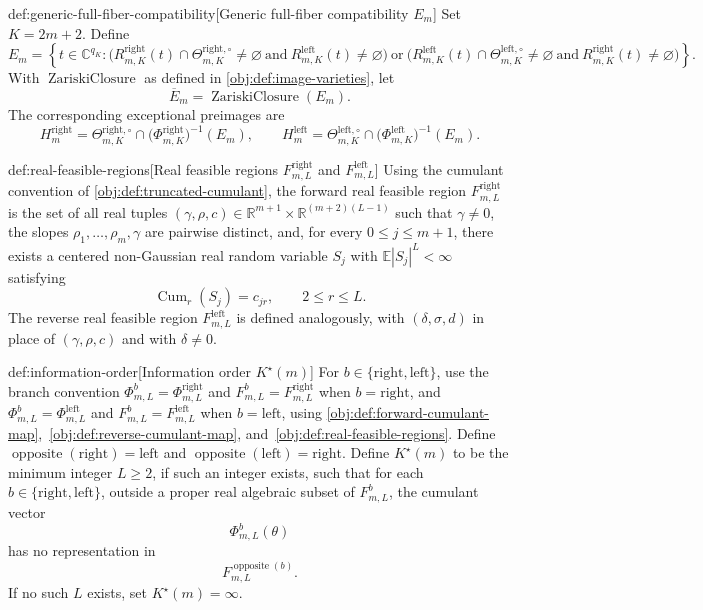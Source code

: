 \begin{definitionv}{def:generic-full-fiber-compatibility}[Generic full-fiber compatibility \(E_m\)]
Set \(K=2m+2\). Define
\[
E_m
=
\left\{
t\in \mathbb C^{q_K}:
\bigl(R^{\mathrm{right}}_{m,K}(t)\cap \Theta^{\mathrm{right},\circ}_{m,K}\neq\varnothing
\ \text{and}\ 
R^{\mathrm{left}}_{m,K}(t)\neq\varnothing\bigr)
\ \text{or}\
\bigl(R^{\mathrm{left}}_{m,K}(t)\cap \Theta^{\mathrm{left},\circ}_{m,K}\neq\varnothing
\ \text{and}\ 
R^{\mathrm{right}}_{m,K}(t)\neq\varnothing\bigr)
\right\}.
\]
With \(\operatorname{ZariskiClosure}\) as defined in \cref{obj:def:image-varieties}, let
\[
\overline E_m=\operatorname{ZariskiClosure}(E_m).
\]
The corresponding exceptional preimages are
\[
H^{\mathrm{right}}_m
=
\Theta^{\mathrm{right},\circ}_{m,K}
\cap
\bigl(\Phi^{\mathrm{right}}_{m,K}\bigr)^{-1}(E_m),
\qquad
H^{\mathrm{left}}_m
=
\Theta^{\mathrm{left},\circ}_{m,K}
\cap
\bigl(\Phi^{\mathrm{left}}_{m,K}\bigr)^{-1}(E_m).
\]
\end{definitionv}

\begin{definitionv}{def:real-feasible-regions}[Real feasible regions \(F^{\mathrm{right}}_{m,L}\) and \(F^{\mathrm{left}}_{m,L}\)]
Using the cumulant convention of \cref{obj:def:truncated-cumulant}, the forward real feasible region \(F^{\mathrm{right}}_{m,L}\) is the set of all real tuples \((\gamma,\rho,c)\in \mathbb R^{m+1}\times \mathbb R^{(m+2)(L-1)}\) such that \(\gamma\neq 0\), the slopes \(\rho_1,\ldots,\rho_m,\gamma\) are pairwise distinct, and, for every \(0\leq j\leq m+1\), there exists a centered non-Gaussian real random variable \(S_j\) with \(\mathbb E|S_j|^L<\infty\) satisfying
\[
\operatorname{Cum}_r(S_j)=c_{jr},
\qquad 2\leq r\leq L.
\]
The reverse real feasible region \(F^{\mathrm{left}}_{m,L}\) is defined analogously, with \((\delta,\sigma,d)\) in place of \((\gamma,\rho,c)\) and with \(\delta\neq 0\).
\end{definitionv}

\begin{definitionv}{def:information-order}[Information order \(K^\star(m)\)]
For \(b\in\{\mathrm{right},\mathrm{left}\}\), use the branch convention \(\Phi^b_{m,L}=\Phi^{\mathrm{right}}_{m,L}\) and \(F^b_{m,L}=F^{\mathrm{right}}_{m,L}\) when \(b=\mathrm{right}\), and \(\Phi^b_{m,L}=\Phi^{\mathrm{left}}_{m,L}\) and \(F^b_{m,L}=F^{\mathrm{left}}_{m,L}\) when \(b=\mathrm{left}\), using \cref{obj:def:forward-cumulant-map},~\cref{obj:def:reverse-cumulant-map}, and~\cref{obj:def:real-feasible-regions}. Define \(\operatorname{opposite}(\mathrm{right})=\mathrm{left}\) and \(\operatorname{opposite}(\mathrm{left})=\mathrm{right}\). Define \(K^\star(m)\) to be the minimum integer \(L\geq 2\), if such an integer exists, such that for each \(b\in\{\mathrm{right},\mathrm{left}\}\), outside a proper real algebraic subset of \(F^b_{m,L}\), the cumulant vector
\[
\Phi^b_{m,L}(\theta)
\]
has no representation in
\[
F^{\operatorname{opposite}(b)}_{m,L}.
\]
If no such \(L\) exists, set \(K^\star(m)=\infty\).
\end{definitionv}

